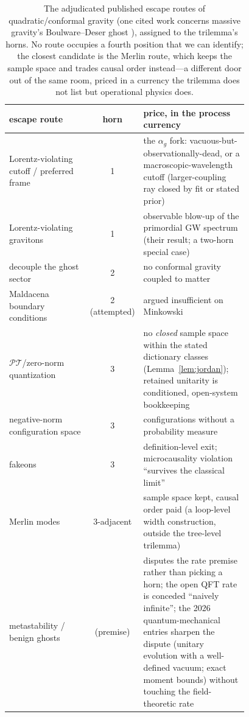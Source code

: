 \documentclass[11pt]{article}
\theoremstyle{definition}
\theoremstyle{remark}
\newcommand{\PT}{\mathcal{PT}}
\newcommand{\ag}{\alpha_g}
\begin{document}
\begin{table}[t]
\centering\small
\begin{tabular}{@{}p{0.34\linewidth}cp{0.44\linewidth}@{}}
\toprule
escape route & horn & price, in the process currency\\
\midrule
Lorentz-violating cutoff / preferred frame
\cite{CJM2004,Konnig2016} & 1 &
the $\ag$ fork: vacuous-but-observationally-dead, or a
macroscopic-wavelength cutoff (larger-coupling ray closed by fit or stated prior)\\
Lorentz-violating gravitons \cite{Deruelle2012} & 1 &
observable blow-up of the primordial GW spectrum (their result; a two-horn special case)\\
decouple the ghost sector & 2 &
no conformal gravity coupled to matter\\
Maldacena boundary conditions \cite{Maldacena2011} & 2
(attempted) & argued insufficient on Minkowski
\cite{HellLustZoupanos2023}\\
$\PT$/zero-norm quantization
\cite{BenderMannheim2008,Mannheim2020} & 3 &
no \emph{closed} sample space within the stated dictionary classes (Lemma~\ref{lem:jordan}); retained unitarity is
conditioned, open-system bookkeeping\\
negative-norm configuration space \cite{SalvioStrumia2016} & 3 &
configurations without a probability measure\\
fakeons \cite{Anselmi2018} & 3 &
definition-level exit; microcausality violation ``survives the
classical limit''\\
Merlin modes \cite{DonoghueMenezes} & 3-adjacent &
sample space kept, causal order paid (a loop-level width construction, outside the tree-level trilemma)\\
metastability / benign ghosts
\cite{Smilga2005,GSTZ2021,SalvioMeta,ErrastiDiez2024,Deffayet2026,EwasiukProfumo2026} &
(premise) & disputes the rate premise rather than picking a horn;
the open QFT rate is conceded ``naively infinite''; the 2026
quantum-mechanical entries sharpen the dispute (unitary evolution
with a well-defined vacuum; exact moment bounds) without touching
the field-theoretic rate\\
\bottomrule
\end{tabular}
\caption{The adjudicated published escape routes of quadratic/conformal gravity
(one cited work concerns massive gravity's Boulware--Deser ghost
\cite{Konnig2016}), assigned to the trilemma's horns. No route
occupies a fourth position that we can identify; the closest
candidate is the Merlin route, which keeps the sample space and
trades causal order instead---a different door out of the same
room, priced in a currency the trilemma does not list but
operational physics does.}
\label{tab:horns}
\end{table}
\end{document}
